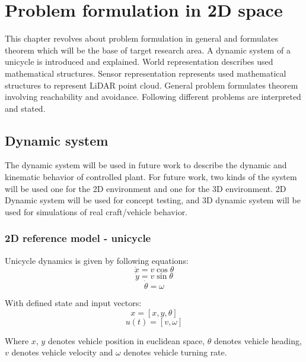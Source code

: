 \chapter {Problem formulation in 2D space}
This chapter revolves about problem formulation in general and formulates theorem which will be the base of target research area.
A dynamic system of a unicycle is introduced and explained. World representation describes used mathematical structures. Sensor representation represents used mathematical structures to represent LiDAR point cloud.
General problem formulates theorem involving reachability and avoidance. Following different problems are interpreted and stated.

\section{Dynamic system}
The dynamic system will be used in future work to describe the dynamic and kinematic behavior of controlled plant. For future work, two kinds of the system will be used one for the 2D environment and one for the 3D environment. 2D Dynamic system will be used for concept testing, and 3D dynamic system will be used for simulations of real craft/vehicle behavior. 

\subsection{2D reference model - unicycle}
Unicycle dynamics is given by following equations:
\begin{equation} \label{eq:uni1}
    \dot{x} = v \cos \theta
\end{equation}
\begin{equation}\label{eq:uni2}
    \dot{y} = v \sin \theta
\end{equation}
\begin{equation}\label{eq:uni3}
    \dot{\theta} = \omega
\end{equation}

With defined state and input vectors:
\begin{equation}\label{eq:uni4}
x = [x, y, \theta ] 
\end{equation}
\begin{equation}\label{eq:uni5}
u(t) = [ v, \omega ]
\end{equation}

Where $x$, $y$ denotes vehicle position in euclidean space, $\theta$ denotes vehicle heading, $v$ denotes vehicle velocity and $\omega$ denotes vehicle turning rate.

